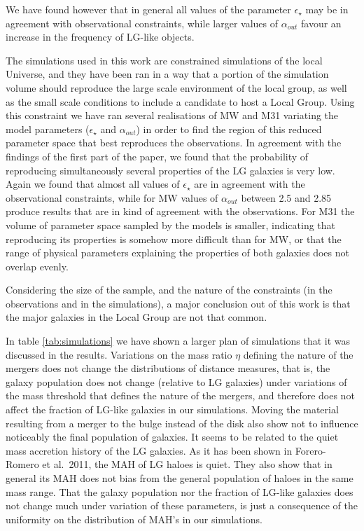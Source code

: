 \documentclass[useAMS,usenatbib]{mn2e}
\newcommand{\etal}{et al.~}
\begin{document}
We have found however that in general all values of the parameter
$\epsilon_{\star}$ may be in agreement with observational constraints,
while larger values of $\alpha_{out}$ favour an increase in the
frequency of LG-like objects.

The simulations used in this work are constrained simulations of the
local Universe, and they have been ran in a way that a portion of the
simulation volume should reproduce the large scale environment of the
local group, as well as the small scale conditions to include a
candidate to host a Local Group. Using this constraint we have ran
several realisations of MW and M31 variating the model parameters
($\epsilon_{\star}$ and $\alpha_{out}$) in order to find the region of
this reduced parameter space that best reproduces the observations. In
agreement with the findings of the first part of the paper, we found
that the probability of reproducing simultaneously several properties
of the LG galaxies is very low.  Again we found that almost all values
of $\epsilon_{\star}$ are in agreement with the observational
constraints, while for MW values of $\alpha_{out}$ between 2.5 and
2.85 produce results that are in kind of agreement with the
observations. For M31 the volume of parameter space sampled by the
models is smaller, indicating that reproducing its properties is
somehow more difficult than for MW, or that the range of physical
parameters explaining the properties of both galaxies does not
overlap evenly.

Considering the size of the sample, and the nature of the constraints
(in the observations and in the simulations), a major conclusion out
of this work is that the major galaxies in the Local Group are not
that common.

In table \ref{tab:simulations} we have shown a larger plan of
simulations that it was discussed in the results. Variations on the
mass ratio $\eta$ defining the nature of the mergers does not change
the distributions of distance measures, that is, the galaxy population
does not change (relative to LG galaxies) under variations of the mass
threshold that defines the nature of the mergers, and therefore does
not affect the fraction of LG-like galaxies in our simulations. Moving
the material resulting from a merger to the bulge instead of the disk
also show not to influence noticeably the final population of
galaxies.  It seems to be related to the quiet mass accretion history
of the LG galaxies. As it has been shown in Forero-Romero \etal 2011,
the MAH of LG haloes is quiet. They also show that in general its MAH
does not bias from the general population of haloes in the same mass
range. That the galaxy population nor the fraction of LG-like galaxies
does not change much under variation of these parameters, is just a
consequence of the uniformity on the distribution of MAH's in our
simulations.
\end{document}
